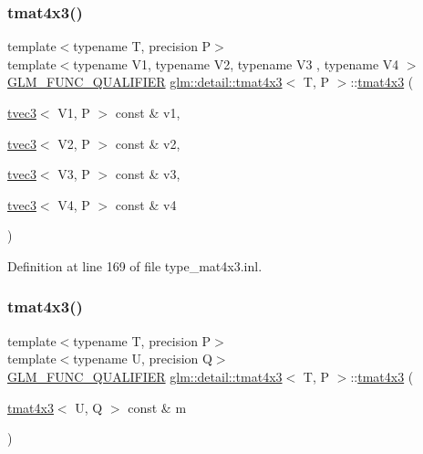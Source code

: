 \subsubsection{\texorpdfstring{tmat4x3()}{tmat4x3()}\hspace{0.1cm}{\footnotesize\ttfamily [21/22]}}
{\footnotesize\ttfamily template$<$typename T, precision P$>$ \\
template$<$typename V1, typename V2, typename V3 , typename V4 $>$ \\
\hyperlink{setup_8hpp_a33fdea6f91c5f834105f7415e2a64407}{G\+L\+M\+\_\+\+F\+U\+N\+C\+\_\+\+Q\+U\+A\+L\+I\+F\+I\+ER} \hyperlink{structglm_1_1detail_1_1tmat4x3}{glm\+::detail\+::tmat4x3}$<$ T, P $>$\+::\hyperlink{structglm_1_1detail_1_1tmat4x3}{tmat4x3} (\begin{DoxyParamCaption}\item[{\hyperlink{structglm_1_1detail_1_1tvec3}{tvec3}$<$ V1, P $>$ const \&}]{v1,  }\item[{\hyperlink{structglm_1_1detail_1_1tvec3}{tvec3}$<$ V2, P $>$ const \&}]{v2,  }\item[{\hyperlink{structglm_1_1detail_1_1tvec3}{tvec3}$<$ V3, P $>$ const \&}]{v3,  }\item[{\hyperlink{structglm_1_1detail_1_1tvec3}{tvec3}$<$ V4, P $>$ const \&}]{v4 }\end{DoxyParamCaption})}



Definition at line 169 of file type\+\_\+mat4x3.\+inl.

\mbox{\label{structglm_1_1detail_1_1tmat4x3_a52fb0f3d88fbe4449d065ac3c9dc0984}} 
\subsubsection{\texorpdfstring{tmat4x3()}{tmat4x3()}\hspace{0.1cm}{\footnotesize\ttfamily [22/22]}}
{\footnotesize\ttfamily template$<$typename T, precision P$>$ \\
template$<$typename U, precision Q$>$ \\
\hyperlink{setup_8hpp_a33fdea6f91c5f834105f7415e2a64407}{G\+L\+M\+\_\+\+F\+U\+N\+C\+\_\+\+Q\+U\+A\+L\+I\+F\+I\+ER} \hyperlink{structglm_1_1detail_1_1tmat4x3}{glm\+::detail\+::tmat4x3}$<$ T, P $>$\+::\hyperlink{structglm_1_1detail_1_1tmat4x3}{tmat4x3} (\begin{DoxyParamCaption}\item[{\hyperlink{structglm_1_1detail_1_1tmat4x3}{tmat4x3}$<$ U, Q $>$ const \&}]{m }\end{DoxyParamCaption})}



